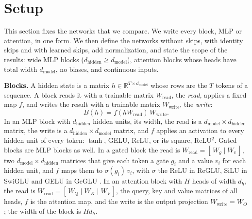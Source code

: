 \documentclass[10pt]{article}
\theoremstyle{definition}
\theoremstyle{remark}
\newcommand{\R}{\mathbb{R}}
\newcommand{\Wread}{W_{\mathrm{read}}}
\newcommand{\Wwrite}{W_{\mathrm{write}}}
\newcommand{\dm}{d_{\mathrm{model}}}
\newcommand{\dhid}{d_{\mathrm{hidden}}}
\newcommand{\para}[1]{\smallskip\noindent\textbf{#1}\hspace{0.5em}}
\begin{document}
\section{Setup}\label{sec:setup}
This section fixes the networks that we compare. We write every block, MLP or attention, in one form. We then define the networks without skips, with identity skips and with learned skips, add normalization, and state the scope of the results: wide MLP blocks ($\dhid \ge \dm$), attention blocks whose heads have total width $\dm$, no biases, and continuous inputs.

\para{Blocks.} A hidden state is a matrix $h \in \R^{T\times\dm}$ whose rows are the $T$ tokens of a sequence. A block reads it with a trainable matrix $\Wread$, the \emph{read}, applies a fixed map $f$, and writes the result with a trainable matrix $\Wwrite$, the \emph{write}:
\begin{equation}\label{eq:block}
B(h) = f(h\Wread)\,\Wwrite.
\end{equation}
In an MLP block with $\dhid$ hidden units, its width, the read is a $\dm\times\dhid$ matrix, the write is a $\dhid\times\dm$ matrix, and $f$ applies an activation to every hidden unit of every token: $\tanh$, GELU, ReLU, or its square, ReLU$^2$. Gated blocks are MLP blocks as well. In a gated block the read is $\Wread = [\,W_g \mid W_v\,]$, two $\dm\times\dhid$ matrices that give each token a gate $g_i$ and a value $v_i$ for each hidden unit, and $f$ maps them to $\sigma(g_i)\,v_i$, with $\sigma$ the ReLU in ReGLU, SiLU in SwiGLU and GELU in GeGLU \citep{shazeer2020glu}. In an attention block with $H$ heads of width $d_h$, the read is $\Wread = [\,W_Q \mid W_K \mid W_V\,]$, the query, key and value matrices of all heads, $f$ is the attention map, and the write is the output projection $\Wwrite = W_O$; the width of the block is $Hd_h$.
\end{document}
